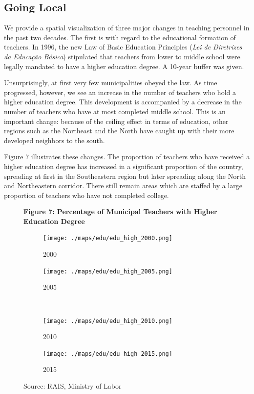 \documentclass[12pt,]{article}
\begin{document}
\subsection{Going Local}

We provide a spatial visualization of three major changes in teaching
personnel in the past two decades. The first is with regard to the
educational formation of teachers. In 1996, the new Law of Basic
Education Principles (\emph{Lei de Diretrizes da Educação Básica})
stipulated that teachers from lower to middle school were legally
mandated to have a higher education degree. A 10-year buffer was given.

Unsurprisingly, at first very few municipalities obeyed the law. As time
progressed, however, we see an increase in the number of teachers who
hold a higher education degree. This development is accompanied by a
decrease in the number of teachers who have at most completed middle
school. This is an important change: because of the ceiling effect in
terms of education, other regions such as the Northeast and the North
have caught up with their more developed neighbors to the south.

Figure 7 illustrates these changes. The proportion of teachers who have
received a higher education degree has increased in a significant
proportion of the country, spreading at first in the Southeastern region
but later spreading along the North and Northeastern corridor. There
still remain areas which are staffed by a large proportion of teachers
who have not completed college.

\begin{figure}
    \centering
    \textbf{Figure 7: Percentage of Municipal Teachers with Higher Education Degree}
     \begin{subfigure}{0.4\textwidth}
        \centering 
        \texttt{[image: ./maps/edu/edu\_high\_2000.png]}
        \caption{2000}
    \end{subfigure} %
    \begin{subfigure}{0.4\textwidth}
        \centering
        \texttt{[image: ./maps/edu/edu\_high\_2005.png]}
        \caption{2005}
    \end{subfigure} \\
    \begin{subfigure}{0.4\textwidth}
        \centering
        \texttt{[image: ./maps/edu/edu\_high\_2010.png]}
        \caption{2010}
    \end{subfigure} %
    \begin{subfigure}{0.4\textwidth}
        \centering
        \texttt{[image: ./maps/edu/edu\_high\_2015.png]}
        \caption{2015}
    \end{subfigure}
    \caption*{\footnotesize \hfill Source: RAIS, Ministry of Labor}
\end{figure}
\end{document}
